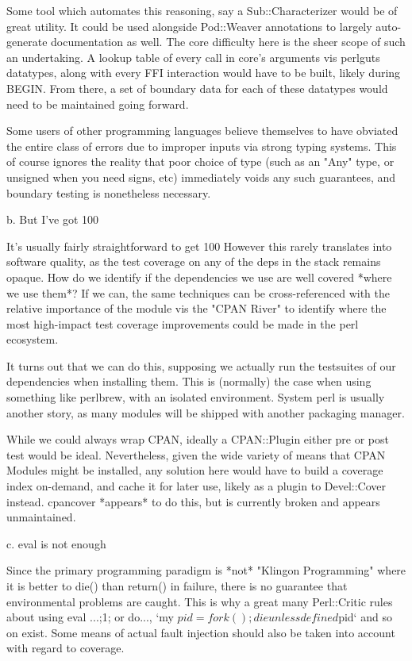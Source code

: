 \documentclass[twoside]{article}
\begin{document}
Some tool which automates this reasoning, say a Sub::Characterizer would be of great utility. It could be used alongside Pod::Weaver annotations to largely auto-generate documentation as well.
The core difficulty here is the sheer scope of such an undertaking.  A lookup table of every call in core's arguments vis perlguts datatypes, along with every FFI interaction would have to be built, likely during BEGIN.
From there, a set of boundary data for each of these datatypes would need to be maintained going forward.

Some users of other programming languages believe themselves to have obviated the entire class of errors due to improper inputs via strong typing systems.
This of course ignores the reality that poor choice of type (such as an "Any" type, or unsigned when you need signs, etc) immediately voids any such guarantees, and boundary testing is nonetheless necessary.

b. But I've got 100%

It's usually fairly straightforward to get 100%
However this rarely translates into software quality, as the test coverage on any of the deps in the stack remains opaque.
How do we identify if the dependencies we use are well covered *where we use them*?
If we can, the same techniques can be cross-referenced with the relative importance of the module vis the "CPAN River" to identify where the most high-impact test coverage improvements could be made in the perl ecosystem.

It turns out that we can do this, supposing we actually run the testsuites of our dependencies when installing them.
This is (normally) the case when using something like perlbrew, with an isolated environment.
System perl is usually another story, as many modules will be shipped with another packaging manager.

While we could always wrap CPAN, ideally a CPAN::Plugin either pre or post test would be ideal.
Nevertheless, given the wide variety of means that CPAN Modules might be installed, any solution here would have to build a coverage index on-demand, and cache it for later use, likely as a plugin to Devel::Cover instead.
cpancover *appears* to do this, but is currently broken and appears unmaintained.

c. eval {} is not enough

Since the primary programming paradigm is *not* "Klingon Programming" where it is better to die() than return() in failure, there is no guarantee that environmental problems are caught.
This is why a great many Perl::Critic rules about using eval {...;1;} or do..., `my $pid=fork(); die unless defined $pid` and so on exist.
Some means of actual fault injection should also be taken into account with regard to coverage.
\end{document}
